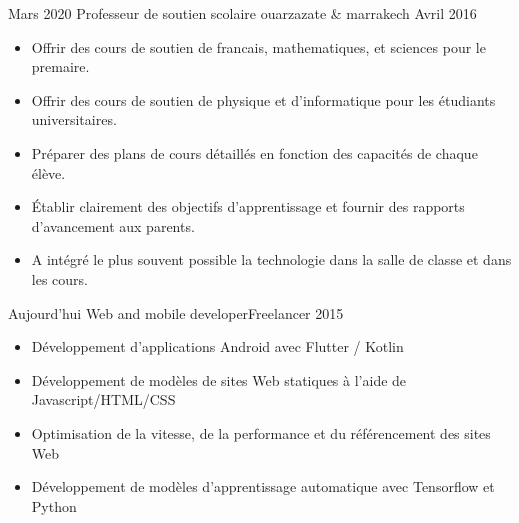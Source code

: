 %
%
%

\begin{experiences}

  \experience
    {Mars 2020}     {Professeur de soutien scolaire} %
    {ouarzazate \& marrakech}{}
    {Avril 2016}    {
                      \begin{itemize}
                        \item {Offrir des cours  de soutien de francais, mathematiques, et sciences pour le premaire.
                        }
                                  \item {Offrir des cours  de soutien de physique et d'informatique pour les étudiants universitaires.
                          }
                        \item {Préparer des plans de cours détaillés en fonction des capacités de chaque élève.
                        }
                        \item {Établir clairement des objectifs d'apprentissage et fournir des rapports d'avancement aux parents.			
                        }
                      \item{A intégré le plus souvent possible la technologie dans la salle de classe et dans les cours.}	
                        
                      \end{itemize}}
                    {}
  \emptySeparator       
  \experience
  {Aujourd'hui}  { Web and mobile developer}{Freelancer}{}
  { 2015}   {
                      \begin{itemize}
                        \item {Développement d'applications Android avec Flutter / Kotlin}
                        \item {Développement de modèles de sites Web statiques à l'aide de Javascript/HTML/CSS}
                        \item {Optimisation de la vitesse, de la performance et du référencement des sites Web}
                        \item {Développement de modèles d'apprentissage automatique avec Tensorflow et Python}            

                      \end{itemize}
                  }
                  {}  
\end{experiences}
